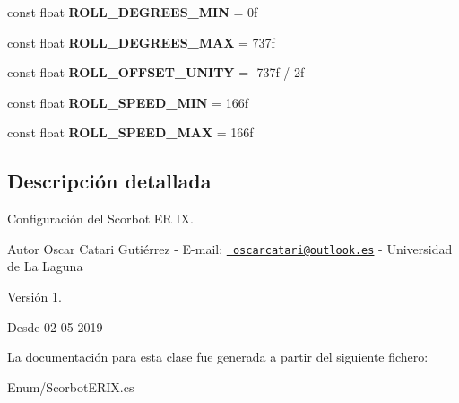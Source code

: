 \begin{DoxyCompactItemize}
const float {\bfseries R\+O\+L\+L\+\_\+\+D\+E\+G\+R\+E\+E\+S\+\_\+\+M\+IN} = 0f
\item 
\mbox{\label{class_scorbot_e_r_i_x_a57eb1a952954a936ef9c3c9032762078}} 
const float {\bfseries R\+O\+L\+L\+\_\+\+D\+E\+G\+R\+E\+E\+S\+\_\+\+M\+AX} = 737f
\item 
\mbox{\label{class_scorbot_e_r_i_x_a40be825d898722ec0a358e688147988c}} 
const float {\bfseries R\+O\+L\+L\+\_\+\+O\+F\+F\+S\+E\+T\+\_\+\+U\+N\+I\+TY} = -\/737f / 2f
\item 
\mbox{\label{class_scorbot_e_r_i_x_a1c5595b243018690f9e9208e8c850ba3}} 
const float {\bfseries R\+O\+L\+L\+\_\+\+S\+P\+E\+E\+D\+\_\+\+M\+IN} = 166f
\item 
\mbox{\label{class_scorbot_e_r_i_x_a0b7d9288b3dbb63dc616b588403e2e96}} 
const float {\bfseries R\+O\+L\+L\+\_\+\+S\+P\+E\+E\+D\+\_\+\+M\+AX} = 166f
\end{DoxyCompactItemize}


\subsection{Descripción detallada}
Configuración del Scorbot ER IX. \begin{DoxyAuthor}{Autor}
Oscar Catari Gutiérrez -\/ E-\/mail\+: \href{mailto:oscarcatari@outlook.es}{\texttt{ oscarcatari@outlook.\+es}} -\/ Universidad de La Laguna 
\end{DoxyAuthor}
\begin{DoxyVersion}{Versión}
1. 
\end{DoxyVersion}
\begin{DoxySince}{Desde}
02-\/05-\/2019 
\end{DoxySince}


La documentación para esta clase fue generada a partir del siguiente fichero\+:\begin{DoxyCompactItemize}
\item 
Enum/Scorbot\+E\+R\+I\+X.\+cs\end{DoxyCompactItemize}
